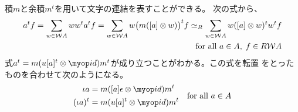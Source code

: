 	積$m$と余積$m^t$を用いて文字の連結を表すことができる。
	次の式から、
	\begin{equation*}\begin{split} %
		a^tf = \sum_{w\in \Word{A}}ww^ta^tf 
		= \sum_{w\in \Word{A}}w\bigr(m(\word{a}\otimes w)\bigl)^tf
		\simeq_R \sum_{w\in \Word{A}}w(\word{a}\otimes w)^tw^tf \\ 
		\quad\text{for all }a\in A,\;f\in R\Word{A}
	\end{split}\end{equation*} %
	式$a^t=m(u\word{a}^t\otimes\myid)m^t$が成り立つことがわかる。この式を転置
	をとったものを合わせて次のようになる。
	\begin{equation*}\begin{split} %
		\iota a &= m(\word{a}\epsilon\otimes \myid)m^t \\
		(\iota a)^t &= m(u\word{a}^t\otimes \myid)m^t \\
	\end{split}
	\quad\text{for all }a\in A
	\end{equation*} %

